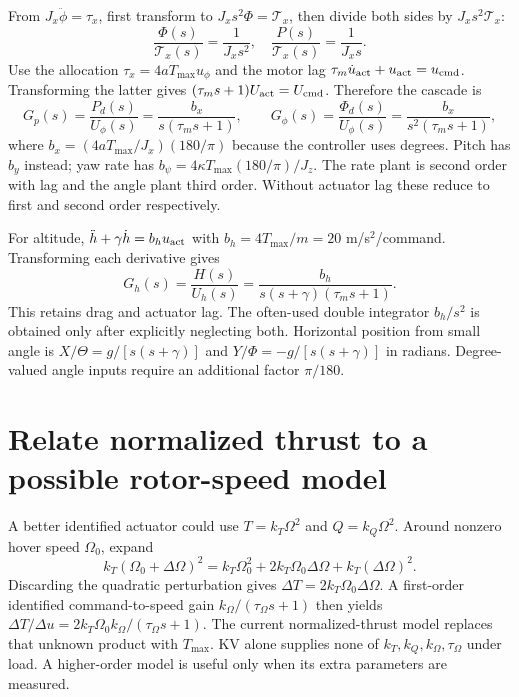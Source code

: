 From $J_x\ddot\phi=\tau_x$, first transform to
$J_xs^2\Phi=\mathcal{T}_x$, then divide both sides by $J_xs^2\mathcal{T}_x$:
\begin{equation}
\frac{\Phi(s)}{\mathcal{T}_x(s)}=\frac{1}{J_xs^2},\quad
\frac{P(s)}{\mathcal{T}_x(s)}=\frac{1}{J_xs}.
\end{equation}
Use the allocation $\tau_x=4aT_{\max}u_\phi$ and the motor lag
$\tau_m\dot u_{\rm act}+u_{\rm act}=u_{\rm cmd}$.
Transforming the latter gives
$(\tau_ms+1)U_{\rm act}=U_{\rm cmd}$. Therefore the cascade is
\begin{equation}
G_{p}(s)=\frac{P_d(s)}{U_\phi(s)}=
\frac{b_x}{s(\tau_ms+1)},\qquad
G_{\phi}(s)=\frac{\Phi_d(s)}{U_\phi(s)}=
\frac{b_x}{s^2(\tau_ms+1)},
\end{equation}
where $b_x=(4aT_{\max}/J_x)(180/\pi)$ because the controller uses degrees.
Pitch has $b_y$ instead; yaw rate has $b_\psi=4\kappa T_{\max}(180/\pi)/J_z$.
The rate plant is second order with lag and the angle plant third order.
Without actuator lag these reduce to first and second order respectively.

For altitude, $\ddot h+\gamma\dot h=b_hu_{\rm act}$ with
$b_h=4T_{\max}/m=20$ m/s$^2$/command. Transforming each derivative gives
\begin{equation}
G_h(s)=\frac{H(s)}{U_h(s)}=
\frac{b_h}{s(s+\gamma)(\tau_ms+1)}.
\end{equation}
This retains drag and actuator lag. The often-used double integrator $b_h/s^2$
is obtained only after explicitly neglecting both. Horizontal position from
small angle is $X/\Theta=g/[s(s+\gamma)]$ and
$Y/\Phi=-g/[s(s+\gamma)]$ in radians. Degree-valued angle inputs require an
additional factor $\pi/180$.

\section{Relate normalized thrust to a possible rotor-speed model}
A better identified actuator could use $T=k_T\Omega^2$ and
$Q=k_Q\Omega^2$. Around nonzero hover speed $\Omega_0$, expand
\begin{equation}
k_T(\Omega_0+\Delta\Omega)^2
=k_T\Omega_0^2+2k_T\Omega_0\Delta\Omega+k_T(\Delta\Omega)^2.
\end{equation}
Discarding the quadratic perturbation gives
$\Delta T=2k_T\Omega_0\Delta\Omega$. A first-order identified command-to-speed
gain $k_\Omega/(\tau_\Omega s+1)$ then yields
$\Delta T/\Delta u=2k_T\Omega_0k_\Omega/(\tau_\Omega s+1)$.
The current normalized-thrust model replaces that unknown product with
$T_{\max}$. KV alone supplies none of $k_T,k_Q,k_\Omega,\tau_\Omega$ under
load. A higher-order model is useful only when its extra parameters are measured.

